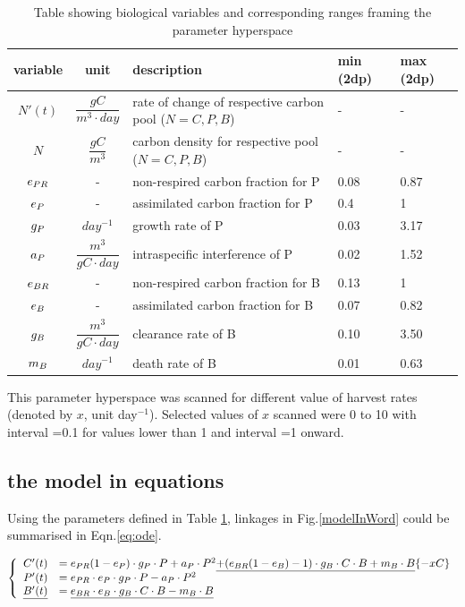 \documentclass[../thesis.tex]{subfiles} %
\begin{document}
\begin{table}[H]
    \centering
    \caption[Algebra variables]{Table showing biological variables and corresponding ranges framing the parameter hyperspace}
    \begin{tabular}{cclll}\hline
        variable & unit & description & min (2dp) & max (2dp) \\\hline
        $N'(t)$ & $\dfrac{gC}{m^3\cdot day}$ & rate of change of respective carbon pool {\tiny($N=C,P,B$)} & - & - \\
        $N$ & $\dfrac{gC}{m^3}$ & carbon density for respective pool {\tiny($N=C,P,B$)} & - & - \\
        $e_{PR}$ & - & non-respired carbon fraction for P & 0.08 & 0.87 \\
        $e_P$ & - & assimilated carbon fraction for P & 0.4 & 1 \\
        $g_P$ & $day^{-1}$ & growth rate of P & 0.03 & 3.17 \\
        $a_P$ & $\dfrac{m^3}{gC\cdot day}$ & intraspecific interference of P & 0.02 & 1.52 \\
        $e_{BR}$ & - & non-respired carbon fraction for B & 0.13 & 1 \\
        $e_B$ & - & assimilated carbon fraction for B & 0.07 & 0.82 \\
        $g_B$ & $\dfrac{m^3}{gC\cdot day}$ & clearance rate of B & 0.10 & 3.50 \\
        $m_B$ & $day^{-1}$ & death rate of B & 0.01 & 0.63 \\
    \hline\end{tabular}
    \label{varInTab}
\end{table}

This parameter hyperspace was scanned for different value of harvest rates (denoted by $x$, unit day$^{-1}$).  Selected values of $x$ scanned were 0 to 10 with interval =0.1 for values lower than 1 and interval =1 onward.

\subsection{the model in equations}
Using the parameters defined in Table \ref{varInTab}, linkages in Fig.\ref{modelInWord} could be summarised in Eqn.\ref{eq:ode}.

\begin{equation}\left\{\begin{array}{rl}
    C'(t) &= e_{PR}(1-e_P)\cdot g_P\cdot P +a_P\cdot P^2 \underline{+(e_{BR}(1-e_B)-1)\cdot g_B\cdot C\cdot B +m_B\cdot B} \{-xC\}\\
    P'(t) &= e_{PR}\cdot e_P\cdot g_P\cdot P -a_P\cdot P^2\\
    \underline{B'(t)} &= \underline{e_{BR}\cdot e_B\cdot g_B\cdot C\cdot B -m_B\cdot B}
\end{array}\right.\label{eq:ode}\end{equation}
\end{document}
